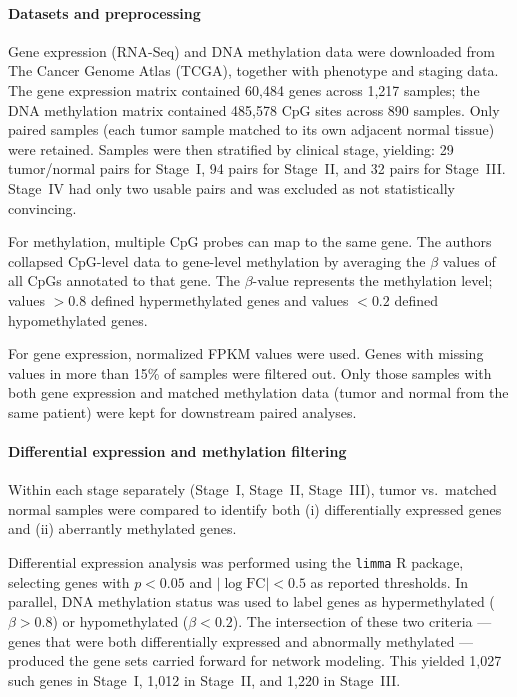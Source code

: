 \documentclass[10pt]{extarticle}
\begin{document}
\paragraph{Datasets and preprocessing}
Gene expression (RNA-Seq) and DNA methylation data were downloaded from The Cancer Genome Atlas (TCGA), together with phenotype and staging data. The gene expression matrix contained 60{,}484 genes across 1{,}217 samples; the DNA methylation matrix contained 485{,}578 CpG sites across 890 samples. Only paired samples (each tumor sample matched to its own adjacent normal tissue) were retained. Samples were then stratified by clinical stage, yielding: 29 tumor/normal pairs for Stage~I, 94 pairs for Stage~II, and 32 pairs for Stage~III. Stage~IV had only two usable pairs and was excluded as not statistically convincing.

For methylation, multiple CpG probes can map to the same gene. The authors collapsed CpG-level data to gene-level methylation by averaging the $\beta$ values of all CpGs annotated to that gene. The $\beta$-value represents the methylation level; values $>0.8$ defined hypermethylated genes and values $<0.2$ defined hypomethylated genes.

For gene expression, normalized FPKM values were used. Genes with missing values in more than 15\% of samples were filtered out. Only those samples with both gene expression and matched methylation data (tumor and normal from the same patient) were kept for downstream paired analyses.

\paragraph{Differential expression and methylation filtering}
Within each stage separately (Stage~I, Stage~II, Stage~III), tumor vs.\ matched normal samples were compared to identify both (i) differentially expressed genes and (ii) aberrantly methylated genes.

Differential expression analysis was performed using the \texttt{limma} R package, selecting genes with $p<0.05$ and $|\log \text{FC}|<0.5$ as reported thresholds. In parallel, DNA methylation status was used to label genes as hypermethylated ($\beta > 0.8$) or hypomethylated ($\beta < 0.2$). The intersection of these two criteria --- genes that were both differentially expressed and abnormally methylated --- produced the gene sets carried forward for network modeling. This yielded 1{,}027 such genes in Stage~I, 1{,}012 in Stage~II, and 1{,}220 in Stage~III.
\end{document}
